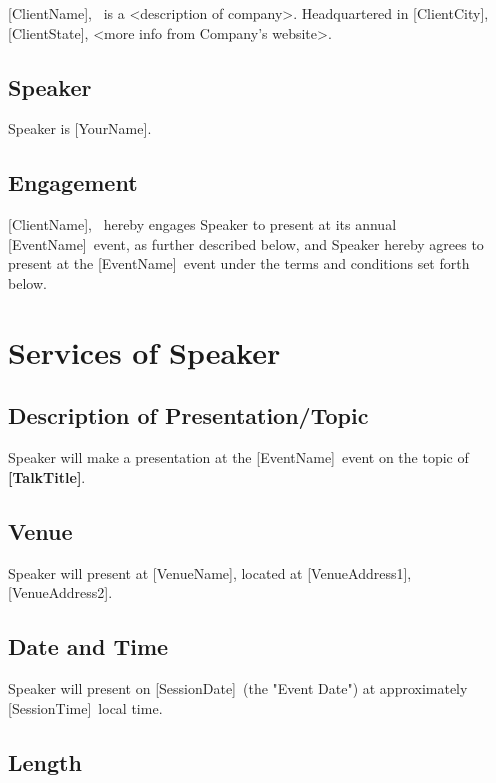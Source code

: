 \documentclass[a4paper,12pt]{article} %
\newcommand{\YourName}{[YourName]}
\newcommand{\TalkTitle}{[TalkTitle]}
\newcommand{\ClientName}{[ClientName]}
\newcommand{\ClientCity}{[ClientCity]}
\newcommand{\ClientState}{[ClientState]}
\newcommand{\EventName}{[EventName]}
\newcommand{\SessionDate}{[SessionDate]}
\newcommand{\SessionTime}{[SessionTime]}
\newcommand{\VenueName}{[VenueName]}
\newcommand{\VenueAddressLineOne}{[VenueAddress1]}
\newcommand{\VenueAddressAddressLineTwo}{[VenueAddress2]}
\begin{document}
\ClientName, ~is a <description of company>. Headquartered in \ClientCity, \ClientState, <more info from Company's website>.

\subsection{Speaker}

Speaker is \YourName.

\subsection{Engagement}

\ClientName, ~hereby engages Speaker to present at its annual \EventName ~event, as further described below, and Speaker hereby agrees to present at the \EventName ~event under the terms and conditions set forth below.


\section{Services of Speaker}

\subsection{Description of Presentation/Topic}

Speaker will make a presentation at the \EventName ~event on the topic of \textbf{\TalkTitle}.

\subsection{Venue}

Speaker will present at \VenueName, located at \VenueAddressLineOne, \VenueAddressAddressLineTwo.

\subsection{Date and Time}

Speaker will present on \SessionDate ~(the "Event Date") at approximately \SessionTime ~local time.

\subsection{Length}
\end{document}
